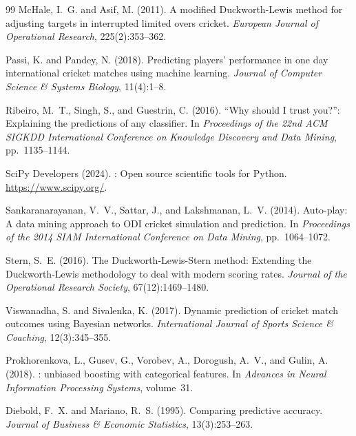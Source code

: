 \documentclass[12pt,a4paper,oneside]{report}
\begin{document}
\begin{thebibliography}{99}
McHale, I.~G. and Asif, M. (2011).
\newblock A modified Duckworth-Lewis method for adjusting targets in interrupted limited overs cricket.
\newblock \emph{European Journal of Operational Research}, 225(2):353--362.

Passi, K. and Pandey, N. (2018).
\newblock Predicting players' performance in one day international cricket matches using machine learning.
\newblock \emph{Journal of Computer Science \& Systems Biology}, 11(4):1--8.

Ribeiro, M.~T., Singh, S., and Guestrin, C. (2016).
\newblock ``{W}hy should {I} trust you?'': Explaining the predictions of any classifier.
\newblock In \emph{Proceedings of the 22nd ACM SIGKDD International Conference on Knowledge Discovery and Data Mining}, pp.~1135--1144.

{SciPy Developers} (2024).
: Open source scientific tools for {Python}.
\newblock \url{https://www.scipy.org/}.

Sankaranarayanan, V.~V., Sattar, J., and Lakshmanan, L.~V. (2014).
\newblock Auto-play: A data mining approach to ODI cricket simulation and prediction.
\newblock In \emph{Proceedings of the 2014 SIAM International Conference on Data Mining}, pp.~1064--1072.

Stern, S.~E. (2016).
\newblock The {D}uckworth-{L}ewis-{S}tern method: Extending the {D}uckworth-{L}ewis methodology to deal with modern scoring rates.
\newblock \emph{Journal of the Operational Research Society}, 67(12):1469--1480.

Viswanadha, S. and Sivalenka, K. (2017).
\newblock Dynamic prediction of cricket match outcomes using Bayesian networks.
\newblock \emph{International Journal of Sports Science \& Coaching}, 12(3):345--355.

Prokhorenkova, L., Gusev, G., Vorobev, A., Dorogush, A.~V., and Gulin, A. (2018).
: unbiased boosting with categorical features.
\newblock In \emph{Advances in Neural Information Processing Systems}, volume~31.

Diebold, F.~X. and Mariano, R.~S. (1995).
\newblock Comparing predictive accuracy.
\newblock \emph{Journal of Business \& Economic Statistics}, 13(3):253--263.


\end{thebibliography}
\end{document}
